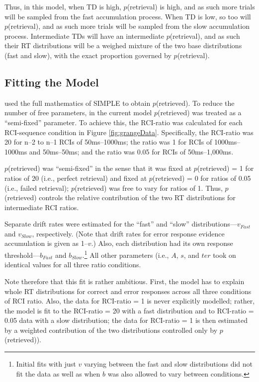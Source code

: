 \documentclass[a4paper, jou, natbib]{apa6}
\begin{document}
Thus, in this model, when TD is high, $p$(retrieval) is high, and as such more trials will be sampled from the fast accumulation process. When TD is low, so too will  $p$(retrieval), and as such more trials will be sampled from the slow accumulation process. Intermediate TDs will have an intermediate $p$(retrieval), and as such their RT distributions will be a weighed mixture of the two base distributions (fast and slow), with the exact proportion governed by $p$(retrieval). 

\subsection{Fitting the Model}

\cite{Grange2015} used the full mathematics of SIMPLE to obtain $p$(retrieved). To reduce the number of free parameters, in the current model $p$(retrieved) was treated as a ``semi-fixed'' parameter. To achieve this, the RCI-ratio was calculated for each RCI-sequence condition in Figure \ref{fig:grangeData}. Specifically, the RCI-ratio was 20 for n--2 to n--1 RCIs of 50ms--1000ms; the ratio was 1 for RCIs of 1000ms--1000ms and 50ms--50ms; and the ratio was 0.05 for RCIs of 50ms--1,000ms. 

$p$(retrieved) was ``semi-fixed'' in the sense that it was fixed at $p$(retrieved) = 1 for ratios of 20 (i.e., perfect retrieval) and fixed at $p$(retrieved) = 0 for ratios of 0.05 (i.e., failed retrieval); $p$(retrieved) was free to vary for ratios of 1. Thus, $p$(retrieved) controls the relative contribution of the two RT distributions for intermediate RCI ratios.

Separate drift rates were estimated for the ``fast'' and ``slow'' distributions---$v_{Fast}$ and $v_{Slow}$, respectively. (Note that drift rates for error response evidence accumulation is given as 1--$v$.) Also, each distribution had its own response threshold---$b_{Fast}$ and $b_{Slow}$.\footnote{Initial fits with just $v$ varying between the fast and slow distributions did not fit the data as well as when $b$ was also allowed to vary between conditions.} All other parameters (i.e., $A$, $s$, and $ter$ took on identical values for all three ratio conditions. 

Note therefore that this fit is rather ambitious. First, the model has to explain whole RT distributions for correct and error responses across all three conditions of RCI ratio. Also, the data for RCI-ratio = 1 is never explicitly modelled; rather, the model is fit to the RCI-ratio = 20 with a fast distribution and to RCI-ratio = 0.05 data with a slow distribution; the data for RCI-ratio = 1 is then estimated by a weighted contribution of the two distributions controlled only by $p$(retrieved)). 
\end{document}
